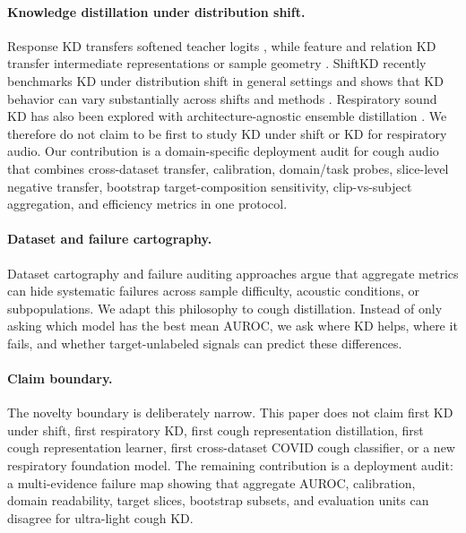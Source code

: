 \paragraph{Knowledge distillation under distribution shift.}
Response KD transfers softened teacher logits \cite{hinton2015distilling}, while feature and relation KD transfer intermediate representations or sample geometry \cite{romero2015fitnets,tian2020crd}. ShiftKD recently benchmarks KD under distribution shift in general settings and shows that KD behavior can vary substantially across shifts and methods \cite{shiftkd2025}. Respiratory sound KD has also been explored with architecture-agnostic ensemble distillation \cite{toikkanen2025respiratorykd}. We therefore do not claim to be first to study KD under shift or KD for respiratory audio. Our contribution is a domain-specific deployment audit for cough audio that combines cross-dataset transfer, calibration, domain/task probes, slice-level negative transfer, bootstrap target-composition sensitivity, clip-vs-subject aggregation, and efficiency metrics in one protocol.

\paragraph{Dataset and failure cartography.}
Dataset cartography and failure auditing approaches argue that aggregate metrics can hide systematic failures across sample difficulty, acoustic conditions, or subpopulations. We adapt this philosophy to cough distillation. Instead of only asking which model has the best mean AUROC, we ask where KD helps, where it fails, and whether target-unlabeled signals can predict these differences.

\paragraph{Claim boundary.}
The novelty boundary is deliberately narrow. This paper does not claim first KD under shift, first respiratory KD, first cough representation distillation, first cough representation learner, first cross-dataset COVID cough classifier, or a new respiratory foundation model. The remaining contribution is a deployment audit: a multi-evidence failure map showing that aggregate AUROC, calibration, domain readability, target slices, bootstrap subsets, and evaluation units can disagree for ultra-light cough KD.
